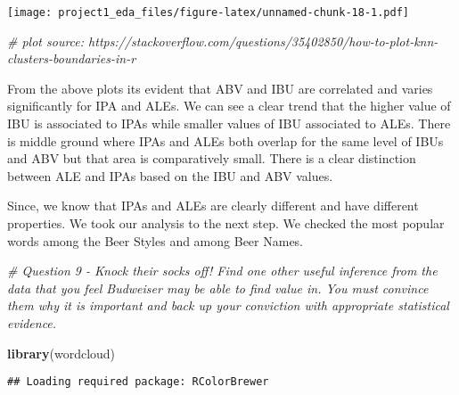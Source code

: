 \documentclass[]{article}
\newenvironment{Shaded}{\begin{snugshade}}{\end{snugshade}}
\newcommand{\CommentTok}[1]{\textcolor[rgb]{0.56,0.35,0.01}{\textit{#1}}}
\newcommand{\KeywordTok}[1]{\textcolor[rgb]{0.13,0.29,0.53}{\textbf{#1}}}
\newcommand{\NormalTok}[1]{#1}
\newcommand{\OperatorTok}[1]{\textcolor[rgb]{0.81,0.36,0.00}{\textbf{#1}}}
\newcommand{\StringTok}[1]{\textcolor[rgb]{0.31,0.60,0.02}{#1}}
\begin{document}
\texttt{[image: project1\_eda\_files/figure-latex/unnamed-chunk-18-1.pdf]}

\begin{Shaded}
\begin{Highlighting}[]
\CommentTok{# plot source: https://stackoverflow.com/questions/35402850/how-to-plot-knn-clusters-boundaries-in-r}
\end{Highlighting}
\end{Shaded}

From the above plots its evident that ABV and IBU are correlated and
varies significantly for IPA and ALEs. We can see a clear trend that the
higher value of IBU is associated to IPAs while smaller values of IBU
associated to ALEs. There is middle ground where IPAs and ALEs both
overlap for the same level of IBUs and ABV but that area is
comparatively small. There is a clear distinction between ALE and IPAs
based on the IBU and ABV values.

Since, we know that IPAs and ALEs are clearly different and have
different properties. We took our analysis to the next step. We checked
the most popular words among the Beer Styles and among Beer Names.

\begin{Shaded}
\begin{Highlighting}[]
\CommentTok{# Question 9 - Knock their socks off!  Find one other useful inference from the data that you feel Budweiser may be able to find value in.  You must convince them why it is important and back up your conviction with appropriate statistical evidence. }

\KeywordTok{library}\NormalTok{(wordcloud)}
\end{Highlighting}
\end{Shaded}

\begin{verbatim}
## Loading required package: RColorBrewer
\end{verbatim}

\begin{Shaded}
\end{Shaded}
\end{document}
